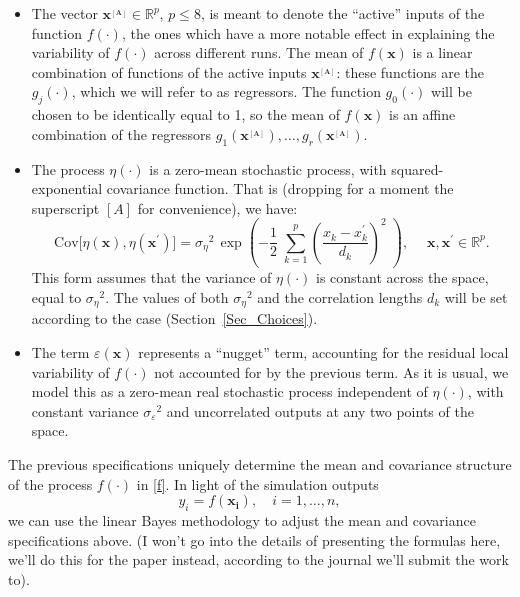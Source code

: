 \documentclass[a4paper, 12pt]{article}
\newcommand{\R}{\mathbb{R}}
\newcommand{\bd}[1]{\boldsymbol{#1}}
\newcommand{\x}{\bd x}
\newcommand{\A}{{_{[A]}}}
\newcommand{\xA}{\bd{x^\A}}
\newcommand{\eps}{\varepsilon}
\begin{document}
\begin{itemize}
 \item The vector $\bd{x^\A} \in \R^p$, $p \leq 8$, is meant to denote the ``active''
       inputs of the function $f(\cdot)$, the ones which have a more notable effect in explaining the variability of $f(\cdot)$ across different runs. The mean of $f(\x)$ is a linear combination of functions of the active inputs $\xA$: these functions are the $g_j(\cdot)$, which we will refer to as regressors. The function $g_0(\cdot)$ will be chosen to be identically equal to 1, so the mean of $f(\x)$ is an affine combination of the regressors $g_1(\xA), \dots, g_r(\xA)$.
 \item The process $\eta(\cdot)$ is a zero-mean stochastic process, with 
       squared-exponential covariance function. That is (dropping for a moment the superscript $[A]$ for convenience), we have:
       \begin{equation}\label{Cov_fun}
         \text{Cov}\big[ \eta(\x), \eta(\x^\prime)  \big] = {\sigma_{\eta}}^2 \,
           \exp \left( 
              - \frac{1}{2} \; \sum_{k=1}^p \left(\frac{x_k - x^\prime_k}{d_k}\right)^2
           \; \right), 
           \quad\; \x, \x^\prime \in \R^p.
       \end{equation}
       This form assumes that the variance of $\eta(\cdot)$ is constant across the space, equal to ${\sigma_\eta}^2$. The values of both ${\sigma_\eta}^2$ and the correlation lengths $d_k$ will be set according to the case (Section~\ref{Sec_Choices}).
 \item The term $\eps(\x)$ represents a ``nugget'' term, accounting for the 
       residual local variability of $f(\cdot)$ not accounted for by the previous term. As it is usual, we model this as a zero-mean real stochastic process independent of $\eta(\cdot)$, with constant variance ${\sigma_\eps}^2$ and uncorrelated outputs at any two points of the space.
\end{itemize}

The previous specifications uniquely determine the mean and covariance structure of the process $f(\cdot)$ in \eqref{f}. In light of the simulation outputs
\begin{equation*}
 y_i = f(\bd{x_i}), \quad i=1, \dots, n,
\end{equation*}
we can use the linear Bayes methodology to adjust the mean and covariance specifications above. (I won't go into the details of presenting the formulas here, we'll do this for the paper instead, according to the journal we'll submit the work to).
\end{document}
